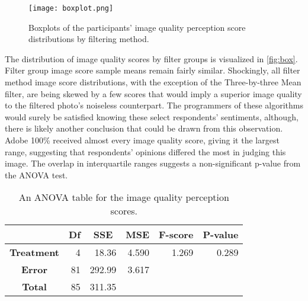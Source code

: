 \documentclass{ncjms}
\begin{document}
\begin{figure}[ht]
  \centering
    \texttt{[image: boxplot.png]}
  \caption{Boxplots of the participants' image quality perception score distributions by filtering method.}
  \label{fig:box}
\end{figure}

The distribution of image quality scores by filter groups is visualized in \autoref{fig:box}. Filter group image score sample means remain fairly similar. Shockingly, all filter method image score distributions, with the exception of the Three-by-three Mean filter, are being skewed by a few scores that would imply a superior image quality to the filtered photo's noiseless counterpart. The programmers of these algorithms would surely be satisfied knowing these select respondents' sentiments, although, there is likely another conclusion that could be drawn from this observation. Adobe 100\% received almost every image quality score, giving it the largest range, suggesting that respondents' opinions differed the most in judging this image. The overlap in interquartile ranges suggests a non-significant p-value from the ANOVA test.

\begin{table}[ht]
\caption{An ANOVA table for the image quality perception scores.} %
\centering %
\begin{tabular}{|c| rrrrr|} %
\hline %
& \multicolumn{1}{c}{\textbf{Df}} & \multicolumn{1}{c}{\textbf{SSE}} & \multicolumn{1}{c}{\textbf{MSE}} & \multicolumn{1}{c}{\textbf{F-score}} & \multicolumn{1}{c|}{\textbf{P-value}} \\ [0.5ex]
\hline %
\textbf{Treatment} & 4 & 18.36 & 4.590 & 1.269 & 0.289 \\ %
\textbf{Error} & 81 & 292.99  & 3.617 & &  \\ [1ex]
\hline
\textbf{Total} & 85 & 311.35 & & & \\ %
\hline %
\end{tabular}
\label{table:anova_table} %
\end{table}
\end{document}
